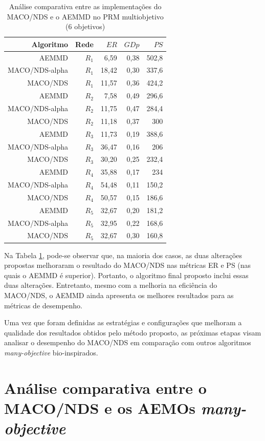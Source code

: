 \begin{table}[!htbp]
	\centering
	\caption{Análise comparativa entre as implementações do MACO/NDS e o AEMMD no PRM multiobjetivo (6 objetivos)}
	\label{tab_exp2_macod_simples}
	\begin{tabular}{rrrrr}
		Algoritmo  & Rede  & $ER$  & $GDp$ & $PS$  \\ \hline
		AEMMD      & $R_1$ & 6,59  & 0,38 & 502,8 \\
		MACO/NDS-alpha & $R_1$ & 18,42 & 0,30 & 337,6 \\
		MACO/NDS     & $R_1$ & 11,57 & 0,36 & 424,2 \\ \hline
		AEMMD      & $R_2$ & 7,58  & 0,49 & 296,6 \\
		MACO/NDS-alpha & $R_2$ & 11,75 & 0,47 & 284,4 \\
		MACO/NDS     & $R_2$ & 11,18 & 0,37 & 300   \\ \hline
		AEMMD      & $R_3$ & 11,73 & 0,19 & 388,6 \\
		MACO/NDS-alpha & $R_3$ & 36,47 & 0,16 & 206   \\
		MACO/NDS     & $R_3$ & 30,20 & 0,25 & 232,4 \\ \hline
		AEMMD      & $R_4$ & 35,88 & 0,17 & 234   \\
		MACO/NDS-alpha & $R_4$ & 54,48 & 0,11 & 150,2 \\
		MACO/NDS     & $R_4$ & 50,57 & 0,15 & 186,6 \\ \hline
		AEMMD      & $R_5$ & 32,67 & 0,20 & 181,2 \\
		MACO/NDS-alpha & $R_5$ & 32,95 & 0,22 & 168,6 \\
		MACO/NDS     & $R_5$ & 32,67 & 0,30 & 160,8
	\end{tabular}
\end{table}

Na Tabela \ref{tab_exp2_macod_simples}, pode-se observar que, na maioria dos casos, as duas alterações propostas melhoraram o resultado do MACO/NDS nas métricas ER e PS (nas quais o AEMMD é superior). Portanto, o algoritmo final proposto inclui essas duas alterações. Entretanto, mesmo com a melhoria na eficiência do MACO/NDS, o AEMMD ainda apresenta os melhores resultados para as métricas de desempenho.

Uma vez que foram definidas as estratégias e configurações que melhoram a qualidade dos resultados obtidos pelo método proposto, as próximas etapas visam analisar o desempenho do MACO/NDS em comparação com outros algoritmos \textit{many-objective} bio-inspirados.

\section{Análise comparativa entre o MACO/NDS e os AEMOs \textit{many-objective}}
\label{section_experimentos_etapa3}

